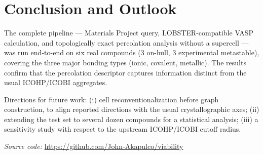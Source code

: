 \documentclass[11pt,a4paper]{article}
\begin{document}
\section{Conclusion and Outlook}

The complete pipeline --- Materials Project query, LOBSTER-compatible
VASP calculation, and topologically exact percolation analysis without a
supercell --- was run end-to-end on six real compounds (3 on-hull, 3
experimental metastable), covering the three major bonding types (ionic,
covalent, metallic). The results confirm that the percolation descriptor
captures information distinct from the usual ICOHP/ICOBI aggregates.

Directions for future work: (i) cell reconventionalization before graph
construction, to align reported directions with the usual crystallographic
axes; (ii) extending the test set to several dozen compounds for a
statistical analysis; (iii) a sensitivity study with respect to the
upstream ICOHP/ICOBI cutoff radius.

\vspace{1cm}
\noindent\textit{Source code:} \url{https://github.com/John-Akapulco/viability}
\end{document}
